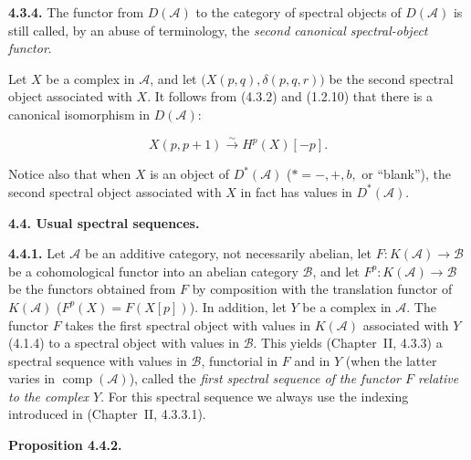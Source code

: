 \clearpage
{}%
\begingroup\small\setlength{\parskip}{0pt}\setlength{\emergencystretch}{1.5em}
\setlength{\abovedisplayskip}{4pt plus 2pt minus 2pt}%
\setlength{\belowdisplayskip}{4pt plus 2pt minus 2pt}%

\noindent\textbf{4.3.4.}\quad
The functor from $D(\mathcal A)$ to the category of spectral objects of
$D(\mathcal A)$ is still called, by an abuse of terminology, the
\emph{second canonical spectral-object functor}.

Let $X$ be a complex in $\mathcal A$, and let
$\bigl(X(p,q),\delta(p,q,r)\bigr)$ be the second spectral object associated
with $X$. It follows from (4.3.2) and (1.2.10) that there is a canonical
isomorphism in $D(\mathcal A)$:

\begin{equation}
X(p,p+1)\xrightarrow{\sim}H^p(X)[-p].
\tag{4.3.4.1}
\end{equation}

Notice also that when $X$ is an object of $D^*(\mathcal A)$
($*=-,+,b,$ or ``blank''), the second spectral object associated with $X$
in fact has values in $D^*(\mathcal A)$.

\medskip\noindent\textbf{4.4. Usual spectral sequences.}

\medskip\noindent\textbf{4.4.1.}\quad
Let $\mathcal A$ be an additive category, not necessarily abelian, let
$F\colon K(\mathcal A)\longrightarrow\mathcal B$ be a cohomological
functor into an abelian category $\mathcal B$, and let
$F^p\colon K(\mathcal A)\longrightarrow\mathcal B$ be the functors
obtained from $F$ by composition with the translation functor of
$K(\mathcal A)$ ($F^p(X)=F(X[p])$). In addition, let $Y$ be a complex in
$\mathcal A$. The functor $F$ takes the first spectral object with values
in $K(\mathcal A)$ associated with $Y$ (4.1.4) to a spectral object with
values in $\mathcal B$. This yields (Chapter~II, 4.3.3) a spectral sequence
with values in $\mathcal B$, functorial in $F$ and in $Y$ (when the latter
varies in $\operatorname{comp}(\mathcal A)$), called the \emph{first
spectral sequence of the functor $F$ relative to the complex $Y$}. For
this spectral sequence we always use the indexing introduced in
(Chapter~II, 4.3.3.1).

\medskip\noindent\textbf{Proposition 4.4.2.}\quad

